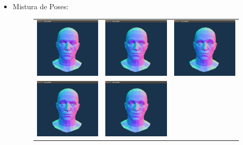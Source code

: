 \documentclass[brazil]{beamer}
\begin{document}
\begin{frame}
  \begin{itemize}
  \item Mistura de Poses:
  \begin{figure}
\centering
      \begin{tabular}{ccc}
\includegraphics[width=0.3\linewidth]{./img/left-closed-eye.png} &
\includegraphics[width=0.3\linewidth]{./img/right-closed-eye.png} &
\includegraphics[width=0.3\linewidth]{./img/left-eyebrow.png} \\
\includegraphics[width=0.3\linewidth]{./img/right-eyebrow.png} &
\includegraphics[width=0.3\linewidth]{./img/rosto-feliz.png} &

\end{tabular}
\end{figure}
\end{itemize}
\end{frame}
\end{document}
